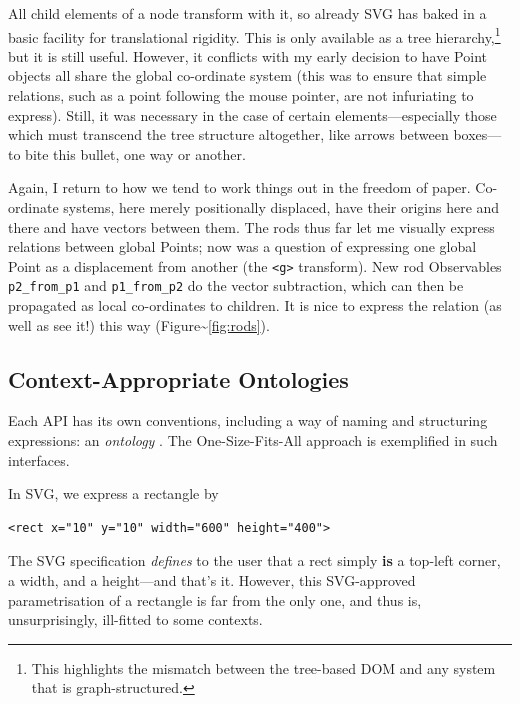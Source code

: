 All child elements of a node transform with it, so already SVG has baked
in a basic facility for translational rigidity. This is only available
as a tree hierarchy,\footnote{This highlights the mismatch between the
  tree-based DOM and any system that is graph-structured.} but it is
still useful. However, it conflicts with my early decision to have Point
objects all share the global co-ordinate system (this was to ensure that
simple relations, such as a point following the mouse pointer, are not
infuriating to express). Still, it was necessary in the case of certain
elements---especially those which must transcend the tree structure
altogether, like arrows between boxes---to bite this bullet, one way or
another.

Again, I return to how we tend to work things out in the freedom of
paper. Co-ordinate systems, here merely positionally displaced, have
their origins here and there and have vectors between them. The rods
thus far let me visually express relations between global Points; now
was a question of expressing one global Point as a displacement from
another (the \texttt{\textless{}g\textgreater{}} transform). New rod
Observables \texttt{p2\_from\_p1} and \texttt{p1\_from\_p2} do the
vector subtraction, which can then be propagated as local co-ordinates
to children. It is nice to express the relation (as well as see it!)
this way (Figure\textasciitilde{}\ref{fig:rods}).

\hypertarget{context-appropriate-ontologies}{%
\subsection{Context-Appropriate
Ontologies}\label{context-appropriate-ontologies}}

Each API has its own conventions, including a way of naming and
structuring expressions: an \emph{ontology} \cite{crit-semprola}. The
One-Size-Fits-All{} approach is exemplified in such interfaces.

In SVG, we express a rectangle by

\begin{lstlisting}
<rect x="10" y="10" width="600" height="400">
\end{lstlisting}

The SVG specification \emph{defines} to the user that a rect simply
\textbf{is} a top-left corner, a width, and a height---and that's it.
However, this SVG-approved parametrisation of a rectangle is far from
the only one, and thus is, unsurprisingly, ill-fitted to some contexts.

